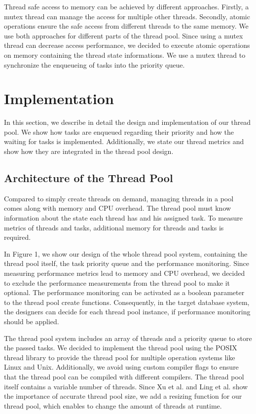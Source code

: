 \documentclass[conference]{IEEEtran}
\begin{document}
Thread safe access to memory can be achieved by different approaches. Firstly, a mutex thread can manage the access for multiple other threads. Secondly, atomic operations ensure the safe access from different threads to the same memory. We use both approaches for different parts of the thread pool. Since using a mutex thread can decrease access performance, we decided to execute atomic operations on memory containing the thread state informations. We use a mutex thread to synchronize the enqueueing of tasks into the priority queue.

\section{Implementation}
In this section, we describe in detail the design and implementation of our thread pool. We show how tasks are enqueued regarding their priority and how the waiting for tasks is implemented. Additionally, we state our thread metrics and show how they are integrated in the thread pool design.

\subsection{Architecture of the Thread Pool}
Compared to simply create threads on demand, managing threads in a pool comes along with memory and CPU overhead. The thread pool must know information about the state each thread has and his assigned task. To measure metrics of threads and tasks, additional memory for threads and tasks is required.

In Figure 1, we show our design of the whole thread pool system, containing the thread pool itself, the task priority queue and the performance monitoring. Since measuring performance metrics lead to memory and CPU overhead, we decided to exclude the performance measurements from the thread pool to make it optional. The performance monitoring can be activated as a boolean parameter to the thread pool create functions. Consequently, in the target database system, the designers can decide for each thread pool instance, if performance monitoring should be applied.

The thread pool system includes an array of threads and a priority queue to store the passed tasks. We decided to implement the thread pool using the POSIX thread library to provide the thread pool for multiple operation systems like Linux and Unix. Additionally, we avoid using custom compiler flags to ensure that the thread pool can be compiled with different compilers. The thread pool itself contains a variable number of threads. Since Xu et al. \cite{xu2004performance} and Ling et al. \cite{ling2000analysis} show the importance of accurate thread pool size, we add a resizing function for our thread pool, which enables to change the amount of threads at runtime.
\end{document}
